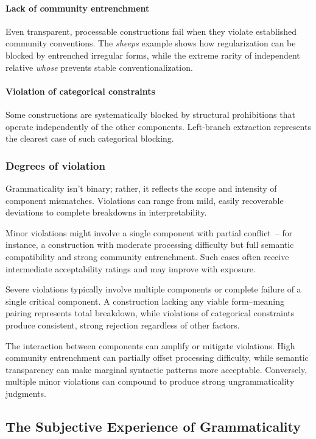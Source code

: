 \documentclass[12pt,letterpaper]{article}
\begin{document}
\paragraph{Lack of community entrenchment}
Even transparent, processable constructions fail when they violate established community conventions. The \textit{sheeps} example shows how regularization can be blocked by entrenched irregular forms, while the extreme rarity of independent relative \textit{whose} prevents stable conventionalization.

\paragraph{Violation of categorical constraints}
Some constructions are systematically blocked by structural prohibitions that operate independently of the other components. Left-branch extraction represents the clearest case of such categorical blocking.

\subsubsection{Degrees of violation}\label{sec:degrees}

Grammaticality isn't binary; rather, it reflects the scope and intensity of component mismatches. Violations can range from mild, easily recoverable deviations to complete breakdowns in interpretability.

Minor violations might involve a single component with partial conflict~-- for instance, a construction with moderate processing difficulty but full semantic compatibility and strong community entrenchment. Such cases often receive intermediate acceptability ratings and may improve with exposure.

Severe violations typically involve multiple components or complete failure of a single critical component. A construction lacking any viable form--meaning pairing represents total breakdown, while violations of categorical constraints produce consistent, strong rejection regardless of other factors.

The interaction between components can amplify or mitigate violations. High community entrenchment can partially offset processing difficulty, while semantic transparency can make marginal syntactic patterns more acceptable. Conversely, multiple minor violations can compound to produce strong ungrammaticality judgments.

\subsection{The Subjective Experience of Grammaticality}\label{sec:subjective}
\end{document}
